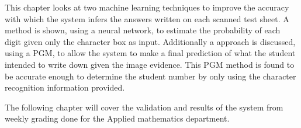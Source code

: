 This chapter looks at two machine learning techniques to improve the accuracy with which the system infers the answers written on each scanned test sheet. A method is shown, using a neural network, to estimate the probability of each digit given only the character box as input. Additionally a approach is discussed, using a PGM, to allow the system to make a final prediction of what the student intended to write down given the image evidence. This PGM method is found to be accurate enough to determine the student number by only using the character recognition information provided.

The following chapter will cover the validation and results of the system from weekly grading done for the Applied mathematics department.